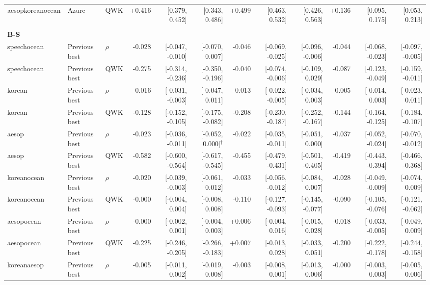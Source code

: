 \begin{landscape}
\begin{longtable}{@{}lllrrrrrrrrr@{}}
aesopkoreanocean & Azure & QWK & +0.416 & [0.379, 0.452] & [0.343, 0.486] & +0.499 & [0.463, 0.532] & [0.426, 0.563] & +0.136 & [0.095, 0.175] & [0.053, 0.213]\\
\addlinespace[2pt]
\midrule\multicolumn{12}{l}{\textbf{Banded minus previous S/D/H metric leader}}\\*
\multicolumn{12}{l}{\textbf{B-S}}\\*
speechocean & Previous best & $\rho$ & -0.028 & [-0.047, -0.010] & [-0.070, 0.007] & -0.046 & [-0.069, -0.025] & [-0.096, -0.006] & -0.044 & [-0.068, -0.023] & [-0.097, -0.005]\\
speechocean & Previous best & QWK & -0.275 & [-0.314, -0.236] & [-0.350, -0.196] & -0.040 & [-0.074, -0.006] & [-0.109, 0.029] & -0.087 & [-0.123, -0.049] & [-0.159, -0.011]\\
korean & Previous best & $\rho$ & -0.016 & [-0.031, -0.003] & [-0.047, 0.011] & -0.013 & [-0.022, -0.005] & [-0.034, 0.003] & -0.005 & [-0.014, 0.003] & [-0.023, 0.011]\\
korean & Previous best & QWK & -0.128 & [-0.152, -0.105] & [-0.175, -0.082] & -0.208 & [-0.230, -0.187] & [-0.252, -0.167] & -0.144 & [-0.164, -0.125] & [-0.184, -0.107]\\
aesop & Previous best & $\rho$ & -0.023 & [-0.036, -0.011] & [-0.052, 0.000]$^{\dagger}$ & -0.022 & [-0.035, -0.011] & [-0.051, 0.000] & -0.037 & [-0.052, -0.024] & [-0.070, -0.012]\\
aesop & Previous best & QWK & -0.582 & [-0.600, -0.564] & [-0.617, -0.545] & -0.455 & [-0.479, -0.431] & [-0.501, -0.405] & -0.419 & [-0.443, -0.394] & [-0.466, -0.368]\\
koreanocean & Previous best & $\rho$ & -0.020 & [-0.039, -0.003] & [-0.061, 0.012] & -0.033 & [-0.056, -0.012] & [-0.084, 0.007] & -0.028 & [-0.049, -0.009] & [-0.074, 0.009]\\
koreanocean & Previous best & QWK & -0.000 & [-0.004, 0.004] & [-0.008, 0.008] & -0.110 & [-0.127, -0.093] & [-0.145, -0.077] & -0.090 & [-0.105, -0.076] & [-0.121, -0.062]\\
aesopocean & Previous best & $\rho$ & -0.000 & [-0.002, 0.001] & [-0.004, 0.003] & +0.006 & [-0.004, 0.016] & [-0.015, 0.028] & -0.018 & [-0.033, -0.005] & [-0.049, 0.009]\\
aesopocean & Previous best & QWK & -0.225 & [-0.246, -0.205] & [-0.266, -0.183] & +0.007 & [-0.013, 0.028] & [-0.033, 0.051] & -0.200 & [-0.222, -0.178] & [-0.244, -0.158]\\
koreanaesop & Previous best & $\rho$ & -0.005 & [-0.011, 0.002] & [-0.019, 0.008] & -0.003 & [-0.008, 0.001] & [-0.013, 0.006] & -0.000 & [-0.003, 0.003] & [-0.005, 0.006]\\

\end{longtable}
\end{landscape}

